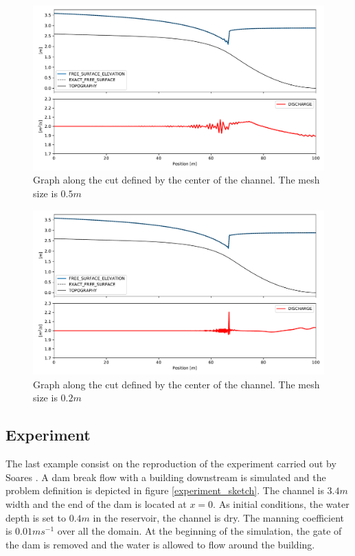 \documentclass[a4paper,12pt]{article}
\begin{document}
\begin{figure}
    \centering
    \includegraphics[width=\textwidth]{img/jump/mesh_0.5.pdf}
    \caption{Graph along the cut defined by the center of the channel. The mesh size is $0.5m$}
    \label{mac_donald_shock_graph_5}
\end{figure}

\begin{figure}
    \centering
    \includegraphics[width=\textwidth]{img/jump/mesh_0.2.pdf}
    \caption{Graph along the cut defined by the center of the channel. The mesh size is $0.2m$}
    \label{mac_donald_shock_graph_2}
\end{figure}


\subsection{Experiment}

The last example consist on the reproduction of the experiment carried out by Soares \cite{soares2007}. A dam break flow with a building downstream is simulated and the problem definition is depicted in figure \ref{experiment_sketch}. The channel is $3.4m$ width and the end of the dam is located at $x=0$. As initial conditions, the water depth is set to $0.4m$ in the reservoir, the channel is dry. The manning coefficient is $0.01ms^{-1}$ over all the domain. At the beginning of the simulation, the gate of the dam is removed and the water is allowed to flow around the building.
\end{document}
